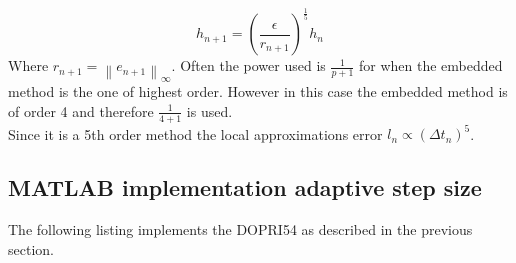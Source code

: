 \begin{equation}
h_{n+1}=\left(\frac{\epsilon}{r_{n+1}}\right)^{\frac{1}{5}} h_{n}
\end{equation}
Where $r_{n+1} = \left\|e_{n+1}\right\|_\infty$. Often the power used is $\frac{1}{p+1}$ for when the embedded method is the one of highest order. However in this case the embedded method is of order 4 and therefore $\frac{1}{4+1}$ is used. \\
Since it is a 5th order method the local approximations error $l_n \propto (\Delta t_n)^{5}$.

\subsection{MATLAB implementation adaptive step size}
The following listing implements the DOPRI54 as described in the previous section.

